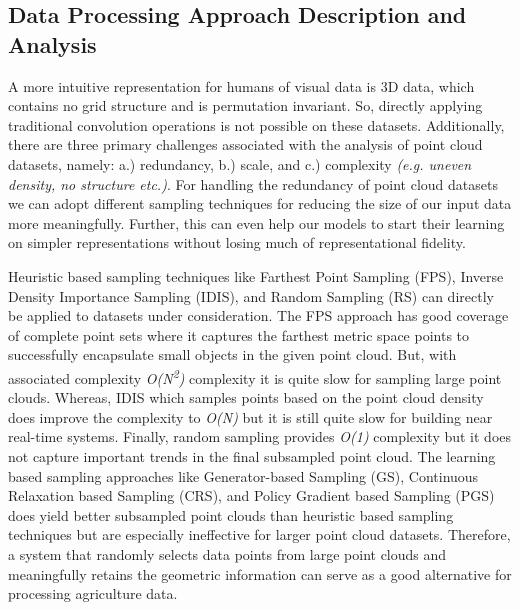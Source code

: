 \documentclass{article}
\begin{document}
\subsection{Data Processing Approach Description and Analysis}


A more intuitive representation for humans of visual data is 3D data, which contains no grid structure and is permutation invariant.
So, directly applying traditional convolution operations is not possible on these datasets.
Additionally, there are three primary challenges associated with the analysis of point cloud datasets, namely: a.) redundancy, b.) scale, and c.) complexity \textit{(e.g. uneven density, no structure etc.)}.
For handling the redundancy of point cloud datasets we can adopt different sampling techniques for reducing the size of our input data more meaningfully. 
Further, this can even help our models to start their learning on simpler representations without losing much of representational fidelity.


Heuristic based sampling techniques like Farthest Point Sampling (FPS), Inverse Density Importance Sampling (IDIS), and Random Sampling (RS) can directly be applied to datasets under consideration.
The FPS approach has good coverage of complete point sets where it captures the farthest metric space points to successfully encapsulate small objects in the given point cloud.
But, with associated complexity \textit{O(N\textsuperscript{2})} complexity it is quite slow for sampling large point clouds. 
Whereas, IDIS which samples points based on the point cloud density does improve the complexity to \textit{O(N)} but it is still quite slow for building near real-time systems.
Finally, random sampling provides \textit{O(1)} complexity but it does not capture important trends in the final subsampled point cloud.
The learning based sampling approaches like Generator-based Sampling (GS), Continuous Relaxation based Sampling (CRS), and Policy Gradient based Sampling (PGS) does yield better subsampled point clouds than heuristic based sampling techniques but are especially ineffective for larger point cloud datasets.
Therefore,  a system that randomly selects data points from large point clouds and meaningfully retains the geometric information can serve as a good alternative for processing agriculture data.
\end{document}
